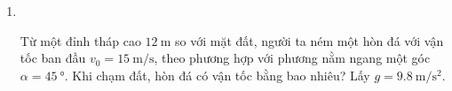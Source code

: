 \begin{enumerate}[label=\bfseries Câu \arabic*:]
{}

\item {}\\
{Từ một đỉnh tháp cao $\SI{12}{\meter}$ so với mặt đất, người ta ném một hòn đá với vận tốc ban đầu $v_0=\SI{15}{\meter/\second}$, theo phương hợp với phương nằm ngang một góc $\alpha=\SI{45}{\degree}$. Khi chạm đất, hòn đá có vận tốc bằng bao nhiêu? Lấy $g = \SI{9.8}{\meter/\second^2}$.
}
\end{enumerate}
